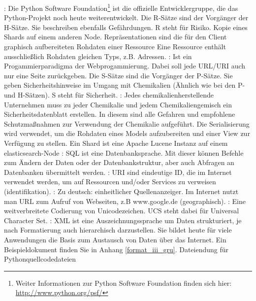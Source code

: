 \begin{acronym}
   :
  Die Python Software Foundation\footnote {Weiter Informationen zur Python
  Software Foundation finden sich hier:
 \url{http://www.python.org/psf/}} ist die offizielle Entwicklergruppe,
die das Python-Projekt noch heute weiterentwickelt.
  Die R-Sätze sind der Vorgänger der H-Sätze. Sie beschreiben
 ebenfalls Gefährdungen. R steht für Risiko.
  Kopie eines Shards auf einem anderen Node.
  Repräsentationen sind die für den Client graphisch
 aufbereiteten Rohdaten einer Ressource
  Eine Ressource enthält ausschließlich Rohdaten gleichen
 Typs, z.B. Adressen.
 :
 Ist ein Progammierparadigma der Webprogammierung. Dabei soll jede URL/URI auch
 nur eine Seite zurückgeben.
  Die S-Sätze sind die Vorgänger der P-Sätze. Sie geben
 Sicherheitshinweise im Umgang mit Chemikalien (Ähnlich wie bei den P- und
 H-Sätzen). S steht für Sicherheit.
 : Jedes chemikalienherstellende Unternehmen
 muss zu jeder Chemikalie und jedem Chemikaliengemisch ein
 Sicherheitsdatenblatt erstellen. In diesem sind alle Gefahren und empfohlene
 Schutzmaßnahmen zur Verwendung der Chemikalie aufgeführt.
  Die Serialisierung wird verwendet, um die Rohdaten
 eines Models aufzubereiten und einer View zur Verfügung zu stellen.
  Ein Shard ist eine Apache Lucene Instanz auf einem
 elasticsearch-Node
 : SQL ist eine Datenbanksprache. Mit
 dieser können Befehle zum Ändern der Daten oder der Datenbankstruktur, aber
 auch Abfragen an Datenbanken übermittelt werden.
 : URI sind eindeutige ID, die im
 Internet verwendet werden, um auf Ressourcen und/oder Services zu verweisen
 (identifikation).
  :  Zu deutsch: einheitlicher
 Quellenanzeiger. Im Internet nutzt man URL zum Aufruf von Webseiten, z.B
 www.google.de (geographisch).
 : Eine weitverbreitete
 Codierung von Unicodezeichen. UCS steht dabei für Universal Character Set.
 : XML ist
 eine Auszeichnungssprache um Daten strukturiert, je nach Formatierung auch
 hierarchisch darzustellen. Sie bildet heute für viele Anwendungen die Basis zum
 Austausch von Daten über das Internet. Ein Beispieldokument finden Sie in
 Anhang \ref{format_iii_gru}.
  Dateiendung für Pythonquellcodedateien
\end{acronym}
